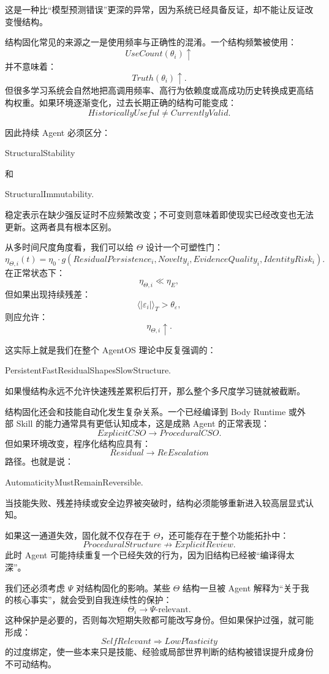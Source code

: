 这是一种比“模型预测错误”更深的异常，因为系统已经具备反证，却不能让反证改变慢结构。

结构固化常见的来源之一是使用频率与正确性的混淆。一个结构频繁被使用：
\[
UseCount(\theta_i)\uparrow
\]
并不意味着：
\[
Truth(\theta_i)\uparrow.
\]
但很多学习系统会自然地把高调用频率、高行为依赖度或高成功历史转换成更高结构权重。如果环境逐渐变化，过去长期正确的结构可能变成：
\[
HistoricallyUseful
\neq
CurrentlyValid.
\]

因此持续 Agent 必须区分：
\begin{statementbox}
StructuralStability
\end{statementbox}
和
\begin{statementbox}
StructuralImmutability.
\end{statementbox}

稳定表示在缺少强反证时不应频繁改变；不可变则意味着即使现实已经改变也无法更新。这两者具有根本区别。

从多时间尺度角度看，我们可以给 $\Theta$ 设计一个可塑性门：
\[
\eta_{\Theta,i}(t)
=
\eta_0
\cdot
g
\left(
ResidualPersistence_i,
Novelty_i,
EvidenceQuality_i,
IdentityRisk_i
\right).
\]
在正常状态下：
\[
\eta_{\Theta,i}\ll \eta_E,
\]
但如果出现持续残差：
\[
\langle |\varepsilon_i|\rangle_T>\theta_\varepsilon,
\]
则应允许：
\[
\eta_{\Theta,i}\uparrow.
\]

这实际上就是我们在整个 AgentOS 理论中反复强调的：
\begin{statementbox}
PersistentFastResidualShapesSlowStructure.
\end{statementbox}

如果慢结构永远不允许快速残差累积后打开，那么整个多尺度学习链就被截断。

结构固化还会和技能自动化发生复杂关系。一个已经编译到 Body Runtime 或外部 Skill 的能力通常具有更低认知成本，这是成熟 Agent 的正常表现：
\[
ExplicitCSO
\rightarrow
ProceduralCSO.
\]
但如果环境改变，程序化结构应具有：
\[
Residual\rightarrow ReEscalation
\]
路径。也就是说：
\begin{statementbox}
AutomaticityMustRemainReversible.
\end{statementbox}
当技能失败、残差持续或安全边界被突破时，结构必须能够重新进入较高层显式认知。

如果这一通道失效，固化就不仅存在于 $\Theta$，还可能存在于整个功能拓扑中：
\[
ProceduralStructure
\not\rightarrow
ExplicitReview.
\]
此时 Agent 可能持续重复一个已经失效的行为，因为旧结构已经被“编译得太深”。

我们还必须考虑 $\Psi$ 对结构固化的影响。某些 $\Theta$ 结构一旦被 Agent 解释为“关于我的核心事实”，就会受到自我连续性的保护：
\[
\Theta_i
\rightarrow
\Psi\text{-relevant}.
\]
这种保护是必要的，否则每次短期失败都可能改写身份。但如果保护过强，就可能形成：
\[
SelfRelevant
\Rightarrow
LowPlasticity
\]
的过度绑定，使一些本来只是技能、经验或局部世界判断的结构被错误提升成身份不可动结构。

